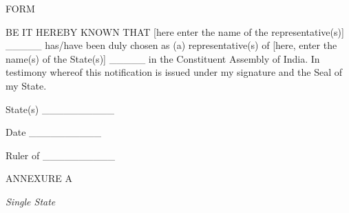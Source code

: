 \begin{center}
FORM \end{center}
BE IT HEREBY KNOWN THAT {[}here enter the name of the representative(s){]} \_\_\_\_\_ has/have been duly chosen as (a) representative(s) of {[}here, enter the name(s) of the State(s){]} \_\_\_\_\_ in the Constituent Assembly of India. In testimony whereof this notification is issued under my signature and the Seal of my State. 

State(s) \_\_\_\_\_\_\_\_\_\_

Date \_\_\_\_\_\_\_\_\_\_

\begin{flushright}
Ruler of \_\_\_\_\_\_\_\_\_\_\end{flushright}
\begin{center}
ANNEXURE A\end{center}
\begin{center}
\emph{Single State}\end{center}


